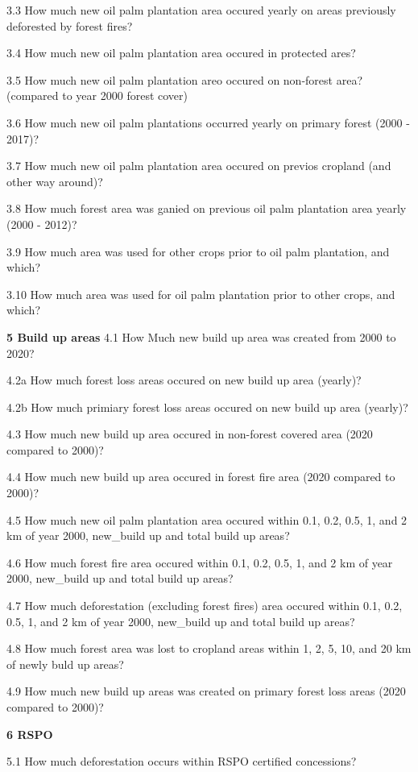 \documentclass[
  letterpaper,
  DIV=11,
  numbers=noendperiod]{scrreprt}
\begin{document}
3.3 How much new oil palm plantation area occured yearly on areas
previously deforested by forest fires?

3.4 How much new oil palm plantation area occured in protected ares?

3.5 How much new oil palm plantation areo occured on non-forest area?
(compared to year 2000 forest cover)

3.6 How much new oil palm plantations occurred yearly on primary forest
(2000 - 2017)?

3.7 How much new oil palm plantation area occured on previos cropland
(and other way around)?

3.8 How much forest area was ganied on previous oil palm plantation area
yearly (2000 - 2012)?

3.9 How much area was used for other crops prior to oil palm plantation,
and which?

3.10 How much area was used for oil palm plantation prior to other
crops, and which?

\textbf{5 Build up areas} 4.1 How Much new build up area was created
from 2000 to 2020?

4.2a How much forest loss areas occured on new build up area (yearly)?

4.2b How much primiary forest loss areas occured on new build up area
(yearly)?

4.3 How much new build up area occured in non-forest covered area (2020
compared to 2000)?

4.4 How much new build up area occured in forest fire area (2020
compared to 2000)?

4.5 How much new oil palm plantation area occured within 0.1, 0.2, 0.5,
1, and 2 km of year 2000, new\_build up and total build up areas?

4.6 How much forest fire area occured within 0.1, 0.2, 0.5, 1, and 2 km
of year 2000, new\_build up and total build up areas?

4.7 How much deforestation (excluding forest fires) area occured within
0.1, 0.2, 0.5, 1, and 2 km of year 2000, new\_build up and total build
up areas?

4.8 How much forest area was lost to cropland areas within 1, 2, 5, 10,
and 20 km of newly buld up areas?

4.9 How much new build up areas was created on primary forest loss areas
(2020 compared to 2000)?

\textbf{6 RSPO}

5.1 How much deforestation occurs within RSPO certified concessions?
\end{document}
